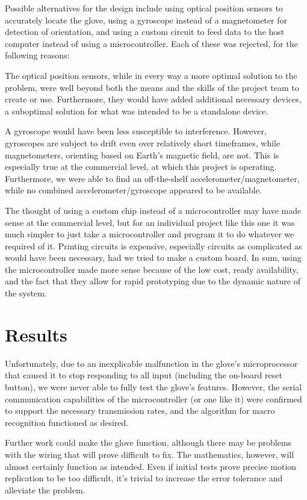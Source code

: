 \documentclass{article}
\begin{document}
	Possible alternatives for the design include using optical position sensors to accurately locate the glove, using a gyroscope instead of a magnetometer for detection of orientation, and using a custom circuit to feed data to the host computer instead of using a microcontroller. Each of these was rejected, for the following reasons:
	
	The optical position sensors, while in every way a more optimal solution to the problem, were well beyond both the means and the skills of the project team to create or use. Furthermore, they would have added additional necessary devices, a suboptimal solution for what was intended to be a standalone device.
	
	A gyroscope would have been less susceptible to interference. However, gyroscopes are subject to drift even over relatively short timeframes, while magnetometers, orienting based on Earth's magnetic field, are not. This is especially true at the commercial level, at which this project is operating. Furthermore, we were able to find an off-the-shelf accelerometer/magnetometer, while no combined accelerometer/gyroscope appeared to be available.
	
	The thought of using a custom chip instead of a microcontroller may have made sense at the commercial level, but for an individual project like this one it was much simpler to just take a microcontroller and program it to do whatever we required of it. Printing circuits is expensive, especially circuits as complicated as would have been necessary, had we tried to make a custom board. In sum, using the microcontroller made more sense because of the low cost, ready availability, and the fact that they allow for rapid prototyping due to the dynamic nature of the system.
	
	
	\section{Results}
	
	
	Unfortunately, due to an inexplicable malfunction in the glove's microprocessor that caused it to stop responding to all input (including the on-board reset button), we were never able to fully test the glove's features. However, the serial communication capabilities of the microcontroller (or one like it) were confirmed to support the necessary transmission rates, and the algorithm for macro recognition functioned as desired.
	
	Further work could make the glove function, although there may be problems with the wiring that will prove difficult to fix. The mathematics, however, will almost certainly function as intended. Even if initial tests prove precise motion replication to be too difficult, it's trivial to increase the error tolerance and alleviate the problem.
	
\end{document}
